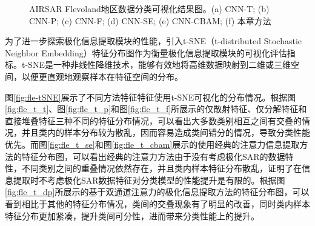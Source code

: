 \begin{figure}[ht]
    \caption{AIRSAR Flevoland地区数据分类可视化结果图。(a) CNN-T; (b) CNN-P; (c) CNN-F; (d) CNN-SE; (e) CNN-CBAM; (f) 本章方法}
    \label{fig:fle_res}
\end{figure}

为了进一步探索极化信息提取模块的性能，引入t-SNE（t-distributed Stochastic Neighbor Embedding）特征分布图作为衡量极化信息提取模块的可视化评估指标。t-SNE是一种非线性降维技术，能够有效地将高维数据映射到二维或三维空间，以便更直观地观察样本在特征空间的分布。

图\ref{fig:fle-tSNE}展示了不同方法特征特征使用t-SNE可视化的分布情况。根据图\ref{fig:fle_t_t}、图\ref{fig:fle_t_p}和图\ref{fig:fle_t_f}所展示的仅散射特征、仅分解特征和直接堆叠特征三种不同的特征分布情况，可以看出大多数类别相互之间有交叠的情况，并且类内的样本分布较为散乱，因而容易造成类间错分的情况，导致分类性能优先。而图\ref{fig:fle_t_se}和图\ref{fig:fle_t_cbam}展示的使用经典的注意力信息提取方法的特征分布图，可以看出经典的注意力方法由于没有考虑极化SAR的数据特性，不同类别之间的重叠情况依然存在，并且类内样本特征分布散乱，证明了在信息提取时不考虑极化SAR数据特征对分类模型的性能提升是有限的。根据图\ref{fig:fle_t_dp}所展示的基于双通道注意力的极化信息提取方法的特征分布图，可以看到相比于其他的特征分布情况，类间的交叠现象有了明显的改善，同时类内样本特征分布更加紧凑，提升类间可分性，进而带来分类性能上的提升。


